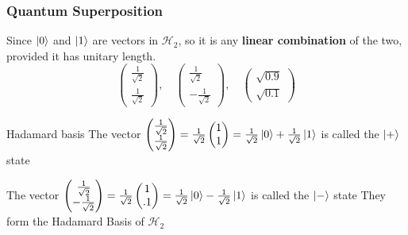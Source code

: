 \documentclass{beamer}
\newcommand{\calH}{\mathcal{H}}
\newcommand{\kz}{\ket{0}}
\newcommand{\ko}{\ket{1}}
\newcommand{\oost}{\frac{1}{\sqrt{2}}}
\begin{document}
\begin{frame}%
\frametitle{Quantum Superposition}

Since $\kz$ and $\ko$ are vectors in $\calH_2$, so it is any \textbf{linear combination} of the two, provided it has unitary length.
\[
	\begin{pmatrix}
	\oost \\
	\oost 
	\end{pmatrix}, \quad
	\begin{pmatrix}
	\oost \\
	-\oost 
	\end{pmatrix}, \quad
	\begin{pmatrix}
	\sqrt{0.9}\\
	\sqrt{0.1}
	\end{pmatrix}
\]
\pause
\begin{block}{Hadamard basis}
The vector $\begin{pmatrix}
	\oost \\
	\oost 
	\end{pmatrix} = 
	\oost\begin{pmatrix}
	1 \\
	1 
	\end{pmatrix} = 
	\oost\kz + \oost\ko$ is called the $\ket{+}$ state

The vector $\begin{pmatrix}
	\oost \\
	-\oost 
	\end{pmatrix} = 
	\oost\begin{pmatrix}
	1 \\
	.1 
	\end{pmatrix} = 
	\oost\kz - \oost\ko$ is called the $\ket{-}$ state	
	They form the Hadamard Basis of $\mathcal{H}_2$
\end{block}
\end{frame}
\end{document}

